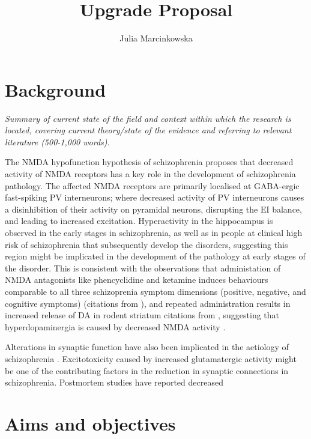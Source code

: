 \documentclass[
  letterpaper,
  DIV=11,
  numbers=noendperiod]{scrartcl}
\title{Upgrade Proposal}
\author{Julia Marcinkowska}
\date{}
\begin{document}
\maketitle


\section{Background}\label{background}

\emph{Summary of current state of the field and context within which the
research is located, covering current theory/state of the evidence and
referring to relevant literature (500-1,000 words).}

The {NMDA} hypofunction hypothesis of schizophrenia proposes that
decreased activity of {NMDA} receptors has a key role in the development
of schizophrenia pathology. The affected {NMDA} receptors are primarily
localised at {GABA}-ergic fast-spiking {PV} interneurons; where
decreased activity of {PV} interneurons causes a disinhibition of their
activity on pyramidal neurons, disrupting the {EI} balance, and leading
to increased excitation. Hyperactivity in the hippocampus is observed in
the early stages in schizophrenia, as well as in people at clinical high
risk of schizophrenia that subsequently develop the disorders,
suggesting this region might be implicated in the development of the
pathology at early stages of the disorder. This is consistent with the
observations that administation of {NMDA} antagonists like phencyclidine
and ketamine induces behaviours comparable to all three schizoprenia
symptom dimensions (positive, negative, and cognitive symptoms)
(citations from \autocite{nakazawa_origin_2020}), and repeated
administration results in increased release of {DA} in rodent striatum
citations from \autocite{nakazawa_origin_2020}, suggesting that
hyperdopaminergia is caused by decreased {NMDA} activity
\autocite{grace_dopamine_2012,grace_dysregulation_2016}.

Alterations in synaptic function have also been implicated in the
aetiology of schizophrenia \autocite{howes_synaptic_2023}.
Excitotoxicity caused by increased glutamatergic activity might be one
of the contributing factors in the reduction in synaptic connections in
schizophrenia. Postmortem studies have reported decreased
\autocite{abdallah_effects_2018}

\section{Aims and objectives}\label{aims-and-objectives}
\end{document}
